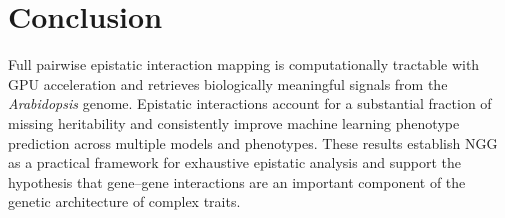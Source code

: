 \documentclass[11pt]{article}
\begin{document}
\section{Conclusion}

Full pairwise epistatic interaction mapping is computationally tractable with GPU acceleration and retrieves biologically meaningful signals from the \textit{Arabidopsis} genome. Epistatic interactions account for a substantial fraction of missing heritability and consistently improve machine learning phenotype prediction across multiple models and phenotypes. These results establish NGG as a practical framework for exhaustive epistatic analysis and support the hypothesis that gene--gene interactions are an important component of the genetic architecture of complex traits.



\end{document}
